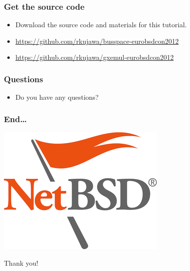 \documentclass[dvipsnames,table]{beamer}
\begin{document}
\begin{frame}
\frametitle{Get the source code}

\begin{itemize}
	\item Download the source code and materials for this tutorial.
	\item {\small\url{https://github.com/rkujawa/busspace-eurobsdcon2012}}
	\item {\small\url{https://github.com/rkujawa/gxemul-eurobsdcon2012}}
\end{itemize}
\end{frame}


\begin{frame}
\frametitle{Questions}

\begin{itemize}
	\item Do you have any questions?
\end{itemize}
\end{frame}

\begin{frame}
\frametitle{End\ldots}
\vspace*{-0.8cm}
\begin{center}
\includegraphics[scale=0.5]{NetBSD.png}

Thank you!
\end{center}
\end{frame}

 
\end{document}
